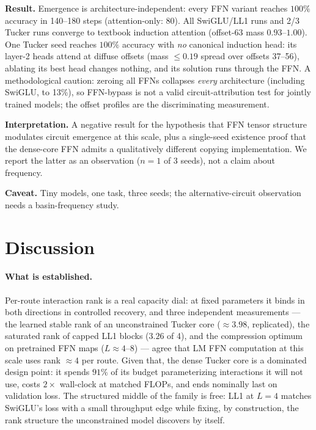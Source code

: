 \documentclass[11pt]{article}
\begin{document}
\textbf{Result.} Emergence is architecture-independent: every FFN variant reaches
$100\%$ accuracy in 140--180 steps (attention-only: 80). All SwiGLU/LL1 runs and 2/3
Tucker runs converge to textbook induction attention (offset-$63$ mass
$0.93$--$1.00$). One Tucker seed reaches $100\%$ accuracy with \emph{no} canonical
induction head: its layer-2 heads attend at diffuse offsets (mass $\le 0.19$ spread
over offsets 37--56), ablating its best head changes nothing, and its solution runs
through the FFN. A methodological caution: zeroing all FFNs collapses \emph{every}
architecture (including SwiGLU, to 13\%), so FFN-bypass is not a valid
circuit-attribution test for jointly trained models; the offset profiles are the
discriminating measurement.

\textbf{Interpretation.} A negative result for the hypothesis that FFN tensor
structure modulates circuit emergence at this scale, plus a single-seed existence
proof that the dense-core FFN admits a qualitatively different copying
implementation. We report the latter as an observation ($n{=}1$ of 3 seeds), not a
claim about frequency.

\textbf{Caveat.} Tiny models, one task, three seeds; the alternative-circuit
observation needs a basin-frequency study.

\section{Discussion}
\label{sec:discussion}

\paragraph{What is established.}
Per-route interaction rank is a real capacity dial: at fixed parameters it binds in
both directions in controlled recovery, and three independent measurements --- the
learned stable rank of an unconstrained Tucker core ($\approx 3.98$, replicated), the
saturated rank of capped LL1 blocks ($3.26$ of 4), and the compression optimum on
pretrained FFN maps ($L \approx 4$--$8$) --- agree that LM FFN computation at this
scale uses rank $\approx 4$ per route. Given that, the dense Tucker core is a
dominated design point: it spends $91\%$ of its budget parameterizing interactions it
will not use, costs $2\times$ wall-clock at matched FLOPs, and ends nominally last on
validation loss. The structured middle of the family is free: LL1 at $L{=}4$ matches
SwiGLU's loss with a small throughput edge while fixing, by construction, the rank
structure the unconstrained model discovers by itself.
\end{document}
